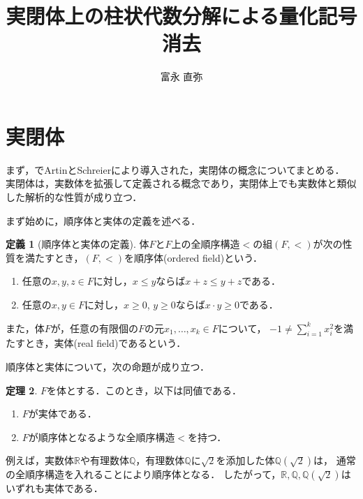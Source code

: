 \documentclass[uplatex, dvipdfmx]{jsarticle}
\numberwithin{equation}{section}
\newcommand{\R}{\mathbb{R}}
\newcommand{\Q}{\mathbb{Q}}
\theoremstyle{definition}
\newtheorem{definition}{定義}[section]
\newtheorem{theorem}[definition]{定理}
\begin{document}
\title{実閉体上の柱状代数分解による量化記号消去}
\author{富永 直弥}
\maketitle

\section{実閉体}

まず，\cite{MR3069467}でArtinとSchreierにより導入された，実閉体の概念についてまとめる．
実閉体は，実数体を拡張して定義される概念であり，実閉体上でも実数体と類似した解析的な性質が成り立つ．

まず始めに，順序体と実体の定義を述べる．

\begin{definition}[順序体と実体の定義]
     体$F$と$F$上の全順序構造$<$の組$(F,<)$が次の性質を満たすとき，$(F,<)$を順序体(ordered field)という．
     \begin{enumerate}
          \item 任意の$x,y,z\in F$に対し，$x \leq y$ならば$x + z \leq y + z$である．
          \item 任意の$x,y \in F$に対し，$x \geq 0$, $y \geq 0$ならば$x \cdot y \geq 0$である．
     \end{enumerate}

     また，体$F$が，任意の有限個の$F$の元$x_1, \dots, x_k \in F$について，
     $-1 \neq \sum_{i=1}^k x_i^2$を満たすとき，実体(real field)であるという．
\end{definition}

順序体と実体について，次の命題が成り立つ．

\begin{theorem}
     $F$を体とする．このとき，以下は同値である．
     \begin{enumerate}
          \item $F$が実体である．
          \item $F$が順序体となるような全順序構造$<$を持つ．
     \end{enumerate}
\end{theorem}


例えば，実数体$\R$や有理数体$\Q$，有理数体$\Q$に$\sqrt{2}$を添加した体$\Q\left(\sqrt{2}\right)$は，
通常の全順序構造を入れることにより順序体となる．
したがって，$\R, \Q, \Q\left(\sqrt{2}\right)$はいずれも実体である．
\end{document}
